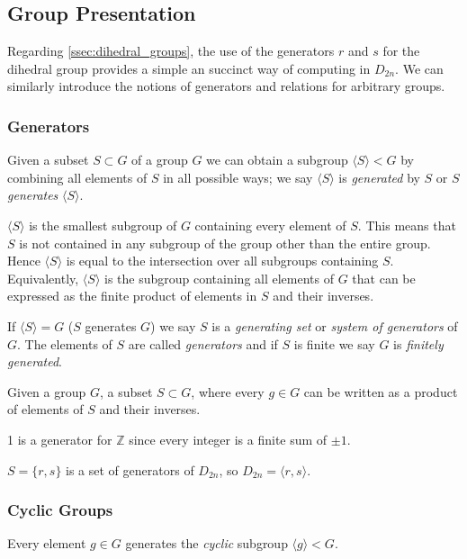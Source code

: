 \subsection{Group Presentation}
Regarding \cref{ssec:dihedral_groups}, the use of the generators \(r\) and \(s\) for the dihedral group provides a simple an succinct way of computing in \(D_{2n}\).
We can similarly introduce the notions of generators and relations for arbitrary groups.

\subsubsection{Generators}
Given a subset \(S \subset G\) of a group \(G\) we can obtain a subgroup \(\langle S \rangle < G\) by combining all elements of \(S\) in all possible ways; we say \(\langle S \rangle\) is \emph{generated} by \(S\) or \(S\) \emph{generates} \(\langle S\rangle\).

\(\langle S \rangle\) is the smallest subgroup of \(G\) containing every element of \(S\).
This means that \(S\) is not contained in any subgroup of the group other than the entire group.
Hence \(\langle S \rangle\) is equal to the intersection over all subgroups containing \(S\).
Equivalently, \(\langle S \rangle\) is the subgroup containing all elements of \(G\) that can be expressed as the finite product of elements in \(S\) and their inverses.

If \(\langle S \rangle = G\) (\(S\) generates \(G\)) we say \(S\) is a \emph{generating set} or \emph{system of generators} of \(G\).
The elements of \(S\) are called \emph{generators} and if \(S\) is finite we say \(G\) is \emph{finitely generated}.

\begin{definition}\label{def:gen_set_group}
   Given a group \(G\), a subset \(S \subset G\), where every \(g \in G\) can be written as a product of elements of \(S\) and their inverses.
\end{definition}
\begin{example}
   1 is a generator for \(\mathbb{Z}\) since every integer is a finite sum of \(\pm 1\).
\end{example}
\begin{example}
   \(S = \{r, s\}\) is a set of generators of \(D_{2n}\), so \(D_{2n} = \langle r, s \rangle\).
\end{example}

\subsubsection{Cyclic Groups}
Every element \(g \in G\) generates the \emph{cyclic} subgroup \(\langle g \rangle < G\).

